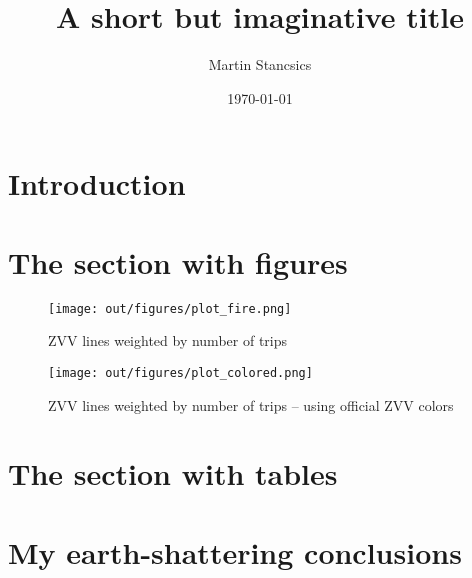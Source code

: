 \documentclass[a4paper]{article}
\author{Martin Stancsics}
\title{A short but imaginative title}
\date{\today}
\begin{document}
\maketitle

\section{Introduction}
\lipsum[1-3]

\section{The section with figures}
\lipsum[4]
\begin{figure}
    \centering
    \texttt{[image: out/figures/plot\_fire.png]}
    \caption{ZVV lines weighted by number of trips}
\end{figure}
\lipsum[5]
\begin{figure}
    \centering
    \texttt{[image: out/figures/plot\_colored.png]}
    \caption{ZVV lines weighted by number of trips -- using official ZVV colors}
\end{figure}

\section{The section with tables}
\lipsum[6]

\lipsum[7]

\section{My earth-shattering conclusions}
\lipsum[8-9]
\end{document}
